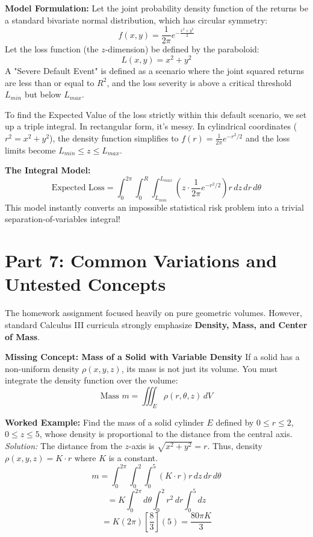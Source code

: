 \documentclass[11pt]{article}
\begin{document}
\textbf{Model Formulation:}
Let the joint probability density function of the returns be a standard bivariate normal distribution, which has circular symmetry:
\[ f(x, y) = \frac{1}{2\pi} e^{-\frac{x^2 + y^2}{2}} \]
Let the loss function (the $z$-dimension) be defined by the paraboloid:
\[ L(x, y) = x^2 + y^2 \]
A "Severe Default Event" is defined as a scenario where the joint squared returns are less than or equal to $R^2$, and the loss severity is above a critical threshold $L_{min}$ but below $L_{max}$.

To find the Expected Value of the loss strictly within this default scenario, we set up a triple integral. In rectangular form, it's messy. In cylindrical coordinates ($r^2 = x^2 + y^2$), the density function simplifies to $f(r) = \frac{1}{2\pi}e^{-r^2/2}$ and the loss limits become $L_{min} \leq z \leq L_{max}$.

\textbf{The Integral Model:}
\[ \text{Expected Loss} = \int_0^{2\pi} \int_0^R \int_{L_{min}}^{L_{max}} \left( z \cdot \frac{1}{2\pi}e^{-r^2/2} \right) r \, dz \, dr \, d\theta \]
This model instantly converts an impossible statistical risk problem into a trivial separation-of-variables integral!

\newpage
\section{Part 7: Common Variations and Untested Concepts}

The homework assignment focused heavily on pure geometric volumes. However, standard Calculus III curricula strongly emphasize \textbf{Density, Mass, and Center of Mass}. 

\textbf{Missing Concept: Mass of a Solid with Variable Density}
If a solid has a non-uniform density $\rho(x,y,z)$, its mass is not just its volume. You must integrate the density function over the volume:
\[ \text{Mass } m = \iiint_E \rho(r, \theta, z) \, dV \]

\textbf{Worked Example:}
Find the mass of a solid cylinder $E$ defined by $0 \leq r \leq 2$, $0 \leq z \leq 5$, whose density is proportional to the distance from the central axis. 
\textit{Solution:}
The distance from the $z$-axis is $\sqrt{x^2+y^2} = r$. Thus, density $\rho(x,y,z) = K \cdot r$ where $K$ is a constant.
\[ m = \int_0^{2\pi} \int_0^2 \int_0^5 (K \cdot r) r \, dz \, dr \, d\theta \]
\[ = K \int_0^{2\pi} d\theta \int_0^2 r^2 \, dr \int_0^5 dz \]
\[ = K (2\pi) \left[ \frac{8}{3} \right] (5) = \frac{80\pi K}{3} \]
\end{document}
